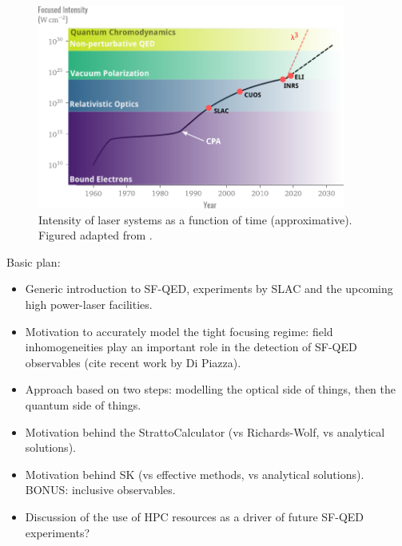 \documentclass[11pt,SymmetricalJury]{inrsthesis/inrsthesis}
\begin{document}
\begin{figure}
  \centering
  \includegraphics[width=0.9\textwidth]{figs/IntensityHistory.pdf}
  \caption[Short history of the intensity of laser systems.]
          {Intensity of laser systems as a function of time (approximative).
            Figured adapted from \cite{Mourou2015}.}
\end{figure}

Basic plan:
  \begin{itemize}
    \item Generic introduction to SF-QED, experiments by SLAC and the upcoming
          high power-laser facilities.
    \item Motivation to accurately model the tight focusing regime: field inhomogeneities
          play an important role in the detection of SF-QED observables (cite recent work by Di Piazza).
    \item Approach based on two steps: modelling the optical side of things, then the quantum side of things.
    \item Motivation behind the StrattoCalculator (vs Richards-Wolf, vs analytical solutions).
    \item Motivation behind SK (vs effective methods, vs analytical solutions). BONUS: inclusive observables.
    \item Discussion of the use of HPC resources as a driver of future SF-QED experiments?
  \end{itemize}
\end{document}
